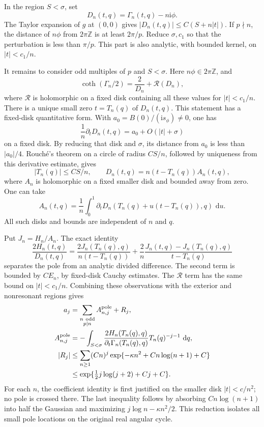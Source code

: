 \documentclass[11pt]{article}
\numberwithin{equation}{section}
\theoremstyle{definition}
\newcommand{\Z}{\mathbb Z}
\newcommand{\ii}{\mathrm i}
\newcommand{\dd}{\,\mathrm d}
\begin{document}
In the region \(S<\sigma\), set
\[
 D_n(t,q)=\Gamma_n(t,q)-n\ii\phi .
 \]
The Taylor expansion of \(g\) at \((0,0)\) gives
\(|D_n(t,q)|\le C(S+n|t|)\).
If \(p\nmid n\), the distance of \(n\phi\) from \(2\pi\Z\) is at
least \(2\pi/p\).  Reduce \(\sigma,c_1\) so that the perturbation
is less than \(\pi/p\).  This part is also analytic, with bounded
kernel, on \(|t|<c_1/n\).

It remains to consider odd multiples of \(p\) and \(S<\sigma\).
Here \(n\phi\in2\pi\Z\), and
\[
 \coth(\Gamma_n/2)=\frac2{D_n}+\mathcal R(D_n),
 \]
where \(\mathcal R\) is holomorphic on a fixed disk containing all
these values for \(|t|<c_1/n\).
There is a unique small zero \(t=T_n(q)\) of \(D_n(t,q)\).
This statement has a fixed-disk quantitative form.  With
\(a_0=B(0)/(\ii s_\phi)\ne0\), one has
\[
 \frac1n\partial_tD_n(t,q)=a_0+O(|t|+\sigma)
 \]
on a fixed disk.  By reducing that disk and \(\sigma\), its
distance from \(a_0\) is less than \(|a_0|/4\).  Rouch\'e's
theorem on a circle of radius \(CS/n\), followed by uniqueness
from this derivative estimate, gives
\begin{equation}
 |T_n(q)|\le CS/n,\qquad
 D_n(t,q)=n(t-T_n(q))A_n(t,q),
 \label{neg:pole-factor}
\end{equation}
where \(A_n\) is holomorphic on a fixed smaller disk and bounded
away from zero.  One can take
\[
 A_n(t,q)=\frac1n\int_0^1
   \partial_tD_n(T_n(q)+u(t-T_n(q)),q)\,\dd u .
 \]
All such disks and bounds are independent of \(n\) and \(q\).

Put \(J_n=H_n/A_n\).  The exact identity
\begin{equation}
 \frac{2H_n(t,q)}{D_n(t,q)}
 =\frac{2J_n(T_n(q),q)}{n(t-T_n(q))}
  +\frac2n
     \frac{J_n(t,q)-J_n(T_n(q),q)}{t-T_n(q)}
 \label{neg:division}
\end{equation}
separates the pole from an analytic divided difference.
The second term is bounded by \(CE_n\), by fixed-disk Cauchy
estimates.  The \(\mathcal R\) term has the same bound on
\(|t|<c_1/n\).  Combining these observations with the exterior
and nonresonant regions gives
\begin{align}
 a_j&=
 \sum_{\substack{n\ {\rm odd}\\p\mid n}}A^{\rm pole}_{n,j}+R_j,
 \label{neg:all-poles}\\
 A^{\rm pole}_{n,j}
 &=-\int_{S<\sigma}
   \frac{2H_n(T_n(q),q)}
        {\partial_t\Gamma_n(T_n(q),q)}
   T_n(q)^{-j-1}\,\dd q ,
 \label{neg:pole-coefficient}\\
 |R_j|
 &\le \sum_{n\ge1}(Cn)^j
             \exp\{-\kappa n^2+C n\log(n+1)+C\}\\
 &\le
 \exp\{\tfrac12 j\log(j+2)+Cj+C\}.
 \label{neg:regular-remainder}
\end{align}
For each \(n\), the coefficient identity is first justified on
the smaller disk \(|t|<c/n^2\); no pole is crossed there.
The last inequality follows by absorbing \(Cn\log(n+1)\) into
half the Gaussian and maximizing \(j\log n-\kappa n^2/2\).
This reduction isolates all small pole locations on the original
real angular cycle.
\end{document}
